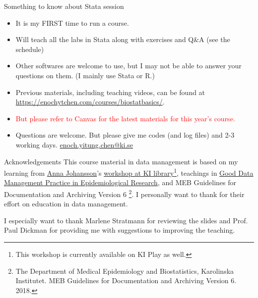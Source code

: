 \begin{frame}{Something to know about Stata session}
\begin{itemize}
\item<1|handout:1-> It is my FIRST time to run a course.
\item<1|handout:1-> Will teach all the labs in Stata along with exercises and Q\&A (see the schedule)
\item<1|handout:1-> Other softwares are welcome to use, but I may not be able to answer your questions on them. (I mainly use Stata or R.)
\item<2|handout:2-> Previous materials, including teaching videos, can be found at \url{https://enochytchen.com/courses/biostatbasics/}. 
\item<2|handout:2-> \textcolor{red}{But please refer to Canvas for the latest materials for this year's course.} 
\item<3|handout:3-> Questions are welcome. But please give me codes (and log files) and 2-3 working days. \href{mailto:enoch.yitung.chen@ki.se}{enoch.yitung.chen@ki.se}

\end{itemize}
\end{frame}

\begin{frame}{Acknowledgements}
This course material in data management is based on my learning from \href{https://staff.ki.se/people/annajo}{Anna Johansson}'s \href{https://play.ki.se/media/Data+Management+and+research+documentation+for+researchers/0_h64ki6v7?_ga=2.131118287.1557257458.1589785892-1364153581.1557067020}{workshop at KI library}\footnote{This workshop is currently available on KI Play as well. }, teachings in \href{https://kiwas.ki.se/katalog/katalog/kurs/851;jsessionid=e42ee2c1f6b081f28bf83e3d0321?lang=en}{Good Data Management Practice in Epidemiological Research}, and MEB Guidelines for Documentation and Archiving Version 6 \footnote{The Department of Medical Epidemiology and Biostatistics, Karolinska Institutet. MEB Guidelines for Documentation and Archiving Version 6. 2018.}. I personally want to thank for their effort on education in data management.

I especially want to thank Marlene Stratmann for reviewing the slides and Prof. Paul Dickman for providing me with suggestions to improving the teaching.

\end{frame}

